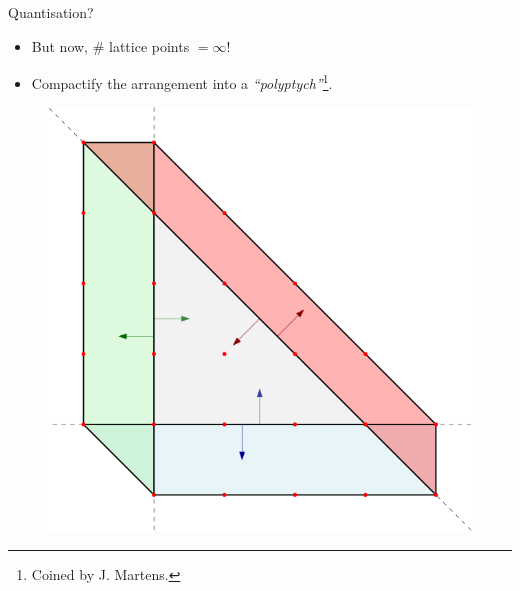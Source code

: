\begin{frame}{Quantisation?}

    \begin{itemize}
       \item But now, $\#$ lattice points $= \infty$!
       \item Compactify the arrangement into a \emph{``polyptych''}\footnote{Coined by J. Martens.}.
    \end{itemize}

    \begin{figure}
        \includegraphics[scale=0.2]{resources/polyptych.png}
    \end{figure}

\end{frame}